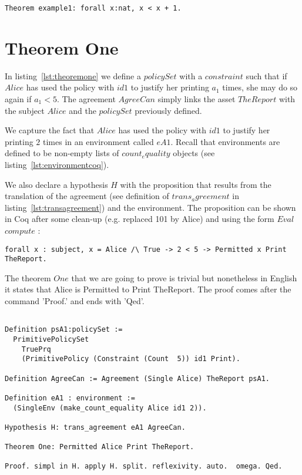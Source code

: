 \lstset{language=Coq}
\begin{lstlisting}[frame=single, caption={Proof Example},label={lst:proofexample}]
Theorem example1: forall x:nat, x < x + 1.
\end{lstlisting}

\section{Theorem One}

In listing~\ref{lst:theoremone} we define a $policySet$ with a $constraint$ such that if $Alice$ has used the policy with $id1$ to justify her printing $a_{1}$ times, she may do so again if $a_{1} < 5$. The agreement $AgreeCan$ simply links the asset $TheReport$ with the subject $Alice$ and the $policySet$ previously defined. 

We capture the fact that $Alice$ has used the policy with $id1$ to justify her printing $2$ times in an environment called $eA1$. Recall that environments are defined to be non-empty lists of $count_equality$ objects (see listing~\ref{lst:environmentcoq}). 

We also declare a hypothesis $H$ with the proposition that results from the translation of the agreement (see definition of $trans_agreement$ in listing~\ref{lst:transagreement}) and the environment. The proposition can be shown in Coq after some clean-up (e.g. replaced 101 by Alice) and using the form $Eval$ $compute$ : 

\lstset{language=Coq}
\begin{lstlisting}[frame=single, caption={Hypothesis for Theorem One},label={lst:theoremonehypo}]
forall x : subject, x = Alice /\ True -> 2 < 5 -> Permitted x Print TheReport.
\end{lstlisting}

The theorem $One$ that we are going to prove is trivial but nonetheless in English it states that Alice is Permitted to Print TheReport. The proof comes after the command 'Proof.' and ends with 'Qed'. 

\lstset{language=Coq}
\begin{lstlisting}[frame=single, caption={Theorem One},label={lst:theoremone}]

Definition psA1:policySet :=
  PrimitivePolicySet
    TruePrq
    (PrimitivePolicy (Constraint (Count  5)) id1 Print).

Definition AgreeCan := Agreement (Single Alice) TheReport psA1.

Definition eA1 : environment := 
  (SingleEnv (make_count_equality Alice id1 2)).

Hypothesis H: trans_agreement eA1 AgreeCan.

Theorem One: Permitted Alice Print TheReport.

Proof. simpl in H. apply H. split. reflexivity. auto.  omega. Qed.


\end{lstlisting}

